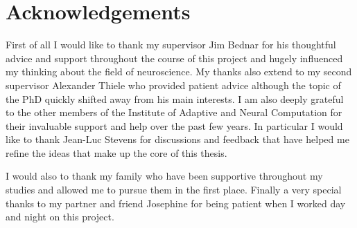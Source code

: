 


\begingroup

\let\clearpage\relax
\let\cleardoublepage\relax
\let\cleardoublepage\relax

\chapter*{Acknowledgements} %

First of all I would like to thank my supervisor Jim Bednar for his
thoughtful advice and support throughout the course of this project
and hugely influenced my thinking about the field of neuroscience. My
thanks also extend to my second supervisor Alexander Thiele who
provided patient advice although the topic of the PhD quickly shifted
away from his main interests. I am also deeply grateful to the other
members of the Institute of Adaptive and Neural Computation for their
invaluable support and help over the past few years. In particular I
would like to thank Jean-Luc Stevens for discussions and feedback that
have helped me refine the ideas that make up the core of this thesis.

I would also to thank my family who have been supportive throughout my
studies and allowed me to pursue them in the first place. Finally a
very special thanks to my partner and friend Josephine for being
patient when I worked day and night on this project.

\endgroup
